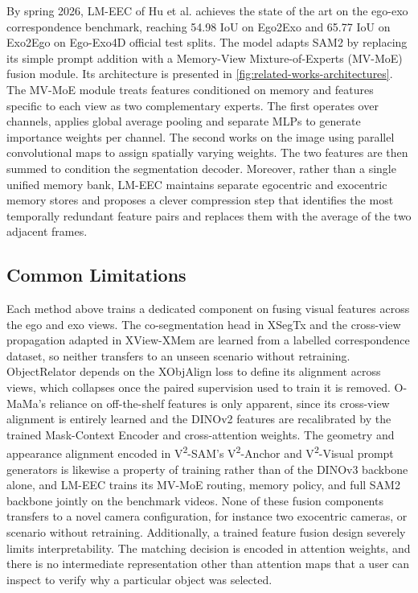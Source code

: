 By spring 2026, LM-EEC of Hu et al. \cite{hu2025lmeec} achieves the state of the art on the ego-exo correspondence benchmark, reaching 54.98 IoU on Ego2Exo and 65.77 IoU on Exo2Ego on Ego-Exo4D official test splits. The model adapts SAM2 by replacing its simple prompt addition with a Memory-View Mixture-of-Experts (MV-MoE) fusion module. Its architecture is presented in \cref{fig:related-works-architectures}. The MV-MoE module treats features conditioned on memory and features specific to each view as two complementary experts. The first operates over channels, applies global average pooling and separate MLPs to generate importance weights per channel. The second works on the image using  parallel convolutional maps to assign spatially varying weights. The two features are then summed to condition the segmentation decoder. Moreover, rather than a single unified memory bank, LM-EEC maintains separate egocentric and exocentric memory stores and proposes a clever compression step that identifies the most temporally redundant feature pairs and replaces them with the average of the two adjacent frames. 

\subsection{Common Limitations}
\label{subsec:common-limitations}
Each method above trains a dedicated component on fusing visual features across the ego and exo views. The co-segmentation head in XSegTx and the cross-view propagation adapted in XView-XMem are learned from a labelled correspondence dataset, so neither transfers to an unseen scenario without retraining. ObjectRelator depends on the XObjAlign loss to define its alignment across views, which collapses once the paired supervision used to train it is removed. O-MaMa's reliance on off-the-shelf features is only apparent, since its cross-view alignment is entirely learned and the DINOv2 features are recalibrated by the trained Mask-Context Encoder and cross-attention weights. The geometry and appearance alignment encoded in V\textsuperscript{2}-SAM's V\textsuperscript{2}-Anchor and V\textsuperscript{2}-Visual prompt generators is likewise a property of training rather than of the DINOv3 backbone alone, and LM-EEC trains its MV-MoE routing, memory policy, and full SAM2 backbone jointly on the benchmark videos. None of these fusion components transfers to a novel camera configuration, for instance two exocentric cameras, or scenario without retraining. Additionally, a trained feature fusion design severely limits interpretability. The matching decision is encoded in attention weights, and there is no intermediate representation other than attention maps that a user can inspect to verify why a particular object was selected. 

